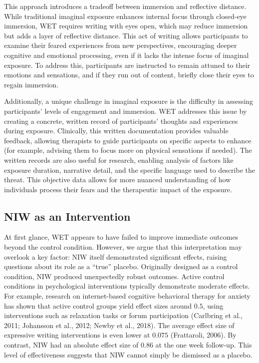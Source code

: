 \documentclass[
  man,floatsintext]{apa7}
\begin{document}
This approach introduces a tradeoff between immersion and reflective distance.
While traditional imaginal exposure enhances internal focus through closed-eye immersion, WET requires writing with eyes open, which may reduce immersion but adds a layer of reflective distance.
This act of writing allows participants to examine their feared experiences from new perspectives, encouraging deeper cognitive and emotional processing, even if it lacks the intense focus of imaginal exposure.
To address this, participants are instructed to remain attuned to their emotions and sensations, and if they run out of content, briefly close their eyes to regain immersion.

Additionally, a unique challenge in imaginal exposure is the difficulty in assessing participants' levels of engagement and immersion.
WET addresses this issue by creating a concrete, written record of participants' thoughts and experiences during exposure.
Clinically, this written documentation provides valuable feedback, allowing therapists to guide participants on specific aspects to enhance (for example, advising them to focus more on physical sensations if needed).
The written records are also useful for research, enabling analysis of factors like exposure duration, narrative detail, and the specific language used to describe the threat.
This objective data allows for more nuanced understanding of how individuals process their fears and the therapeutic impact of the exposure.

\subsection{NIW as an Intervention}\label{niw-as-an-intervention}

At first glance, WET appears to have failed to improve immediate outcomes beyond the control condition.
However, we argue that this interpretation may overlook a key factor: NIW itself demonstrated significant effects, raising questions about its role as a ``true'' placebo.
Originally designed as a control condition, NIW produced unexpectedly robust outcomes.
Active control conditions in psychological interventions typically demonstrate moderate effects.
For example, research on internet-based cognitive behavioral therapy for anxiety has shown that active control groups yield effect sizes around \(0.5\), using interventions such as relaxation tasks or forum participation (Carlbring et al., 2011; Johansson et al., 2012; Newby et al., 2018).
The average effect size of expressive writing interventions is even lower at \(0.075\) (Frattaroli, 2006).
By contrast, NIW had an absolute effect size of \(0.86\) at the one week follow-up.
This level of effectiveness suggests that NIW cannot simply be dismissed as a placebo.
\end{document}
